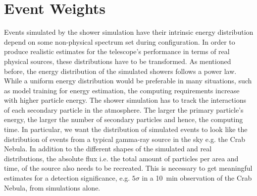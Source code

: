 \section{Event Weights}
\label{sec:weights}
\newcommand{\emin}{E_\text{min}}
\newcommand{\emax}{E_\text{max}}
\newcommand{\phisim}{\Phi_{\text{Sim}}}
\newcommand{\asim}{A_\text{sim}}
Events simulated by the shower simulation \corsika have their intrinsic energy distribution depend on some non-physical spectrum 
set during configuration. In order to produce realistic estimates for the telescope's performance in terms of real physical sources, these distributions 
have to be transformed. As mentioned before, the energy distribution of the simulated showers follows a power law. 
While a uniform energy distribution would be preferable in many situations, such as model training for energy estimation, the computing requirements 
increase with higher particle energy. The shower simulation has to track the interactions of each secondary particle in the atmosphere. 
The larger the primary particle's energy, the larger the number of secondary particles and hence, the computing time. 
In particular, we want the distribution of simulated events to look like the distribution of events from a typical gamma-ray source in the sky e.g. the Crab Nebula. 
In addition to the different shapes of the simulated and real distributions, the absolute flux i.e. the total amount of particles 
per area and time, of the source also needs to be recreated. 
This is necessary to get meaningful estimates for a detection significance, e.g. $5\sigma$ in a \SI{10}{\minute} observation of the Crab Nebula, from simulations alone.

